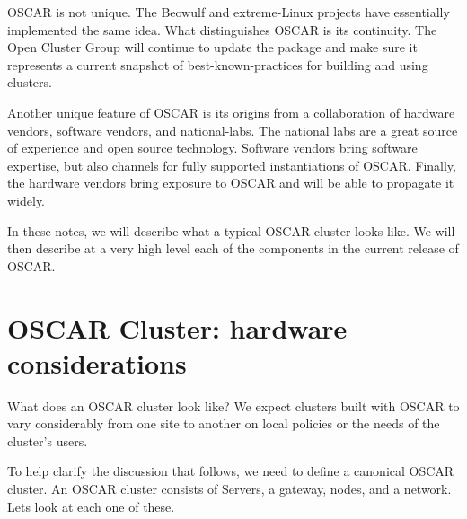 \documentclass[letterpaper,11pt]{article}
\begin{document}
OSCAR is not unique.  The Beowulf and extreme-Linux projects have
essentially implemented the same idea.  What distinguishes OSCAR is
its continuity.  The Open Cluster Group will continue to update the
package and make sure it represents a current snapshot of
best-known-practices for building and using clusters.

Another unique feature of OSCAR is its origins from a collaboration of
hardware vendors, software vendors, and national-labs.  The national
labs are a great source of experience and open source technology.
Software vendors bring software expertise, but also channels for fully
supported instantiations of OSCAR.  Finally, the hardware vendors
bring exposure to OSCAR and will be able to propagate it widely.

In these notes, we will describe what a typical OSCAR cluster looks
like.  We will then describe at a very high level each of the
components in the current release of OSCAR.

\section{OSCAR Cluster: hardware considerations}
What does an OSCAR cluster look like?  We expect clusters built with
OSCAR to vary considerably from one site to another on local policies
or the needs of the cluster's users.

To help clarify the discussion that follows, we need to define a
canonical OSCAR cluster.  An OSCAR cluster consists of Servers, a
gateway, nodes, and a network.  Lets look at each one of these.
\end{document}
